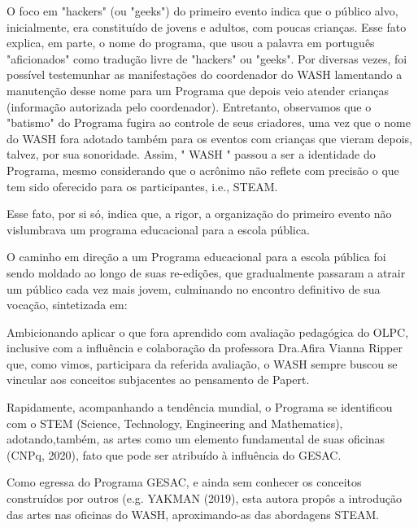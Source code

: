O foco em "hackers" (ou "geeks") do primeiro evento indica que o público alvo, inicialmente, era constituído de jovens e adultos, com  poucas crianças. Esse fato explica, em parte, o nome do programa, que usou a palavra em português "aficionados" como tradução livre de "hackers" ou "geeks". Por diversas vezes, foi possível testemunhar as manifestações do coordenador do WASH lamentando a manutenção desse nome para um Programa que depois veio atender crianças (informação autorizada pelo coordenador). Entretanto, observamos que o "batismo" do Programa fugira ao controle de seus criadores, uma vez que o nome do WASH fora adotado também para os eventos com crianças que vieram depois, talvez, por sua sonoridade. Assim, " WASH " passou a ser a identidade do Programa, mesmo considerando que o acrônimo não reflete com precisão o que tem sido oferecido para os participantes, i.e., STEAM.

Esse fato, por si só, indica que, a rigor, a organização do primeiro evento não vislumbrava um programa educacional para a escola pública.

O caminho em direção a um Programa educacional para a escola pública foi sendo moldado ao longo de suas re-edições, que gradualmente passaram a atrair um público cada vez mais jovem, culminando no encontro definitivo de sua vocação, sintetizada em:


\noindent\begin{flushright}\mbox{\linespread{1}\selectfont\centering{}}\end{flushright}


Ambicionando aplicar o que fora aprendido com avaliação pedagógica do OLPC, inclusive com a influência e colaboração da professora Dra.Afira Vianna Ripper que, como vimos, participara da referida avaliação, o WASH sempre buscou se vincular aos conceitos subjacentes ao pensamento de Papert.

Rapidamente, acompanhando a tendência mundial, o Programa se identificou com o STEM (Science, Technology, Engineering and Mathematics), adotando,também, as artes como um elemento fundamental de suas oficinas  (CNPq, 2020), fato que pode ser atribuído à influência do GESAC.

Como egressa do Programa GESAC, e ainda sem conhecer os conceitos construídos por outros (e.g. YAKMAN (2019), esta autora propôs a introdução das artes nas oficinas do WASH, aproximando-as das abordagens STEAM.

